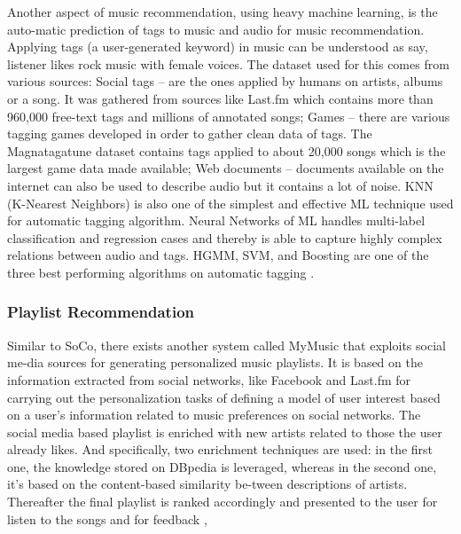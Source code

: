 \documentclass{proc}
\begin{document}
Another aspect of music recommendation, using heavy machine learning, is the auto-matic prediction of tags to music and audio for music recommendation. Applying tags (a user-generated keyword) in music can be understood as say, listener likes rock music with female voices. The dataset used for this comes from various sources: Social tags – are the ones applied by humans on artists, albums or a song. It was gathered from sources like Last.fm which contains more than 960,000 free-text tags and millions of annotated songs; Games – there are various tagging games developed in order to gather clean data of tags. The Magnatagatune dataset contains tags applied to about 20,000 songs which is the largest game data made available; Web documents – documents available on the internet can also be used to describe audio but it contains a lot of noise. 
KNN (K-Nearest Neighbors) is also one of the simplest and effective ML technique used for automatic tagging algorithm. Neural Networks of ML handles multi-label classification and regression cases and thereby is able to capture highly complex relations between audio and tags. HGMM, SVM, and Boosting are one of the three best performing algorithms on automatic tagging \cite{bertin-mahieux09}. 


\subsubsection{Playlist Recommendation}
Similar to SoCo, there exists another system called MyMusic that exploits social me-dia sources for generating personalized music playlists. It is based on the information extracted from social networks, like Facebook and Last.fm for carrying out the personalization tasks of defining a model of user interest based on a user’s information related to music preferences on social networks. The social media based playlist is enriched with new artists related to those the user already likes. And specifically, two enrichment techniques are used: in the first one, the knowledge stored on DBpedia is leveraged, whereas in the second one, it’s based on the content-based similarity be-tween descriptions of artists. Thereafter the final playlist is ranked accordingly and presented to the user for listen to the songs and for feedback \cite{Musto2012},
\end{document}
